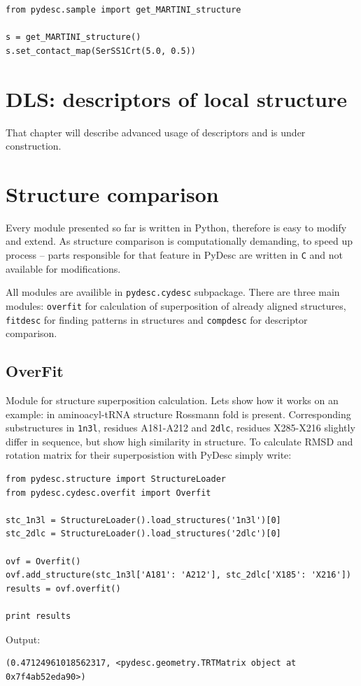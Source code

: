 \documentclass{article}
\begin{document}
\begin{lstlisting}
from pydesc.sample import get_MARTINI_structure

s = get_MARTINI_structure()
s.set_contact_map(SerSS1Crt(5.0, 0.5))
\end{lstlisting}


\section{DLS: descriptors of local structure} \label{PyDLSsec}

That chapter will describe advanced usage of descriptors and is under construction.



\section{Structure comparison} \label{CyDESCsec}

Every module presented so far is written in Python, therefore is easy to modify and extend. As structure comparison is computationally demanding, to speed up process -- parts responsible for that feature in PyDesc are written in \texttt{C} and not available for modifications.

All modules are availible in \texttt{pydesc.cydesc} subpackage. There are three main modules: \texttt{overfit} for calculation of superposition of already aligned structures, \texttt{fitdesc} for finding patterns in structures and \texttt{compdesc} for descriptor comparison.

%
%
\subsection{OverFit}

Module for structure superposition calculation.
Lets show how it works on an example: in aminoacyl-tRNA structure Rossmann fold is present.
Corresponding substructures in \texttt{1n3l}, residues A181-A212 and \texttt{2dlc}, residues X285-X216 slightly differ in sequence, but show high similarity in structure. To calculate RMSD and rotation matrix for their superposistion with PyDesc simply write:

\begin{lstlisting}
from pydesc.structure import StructureLoader
from pydesc.cydesc.overfit import Overfit

stc_1n3l = StructureLoader().load_structures('1n3l')[0]
stc_2dlc = StructureLoader().load_structures('2dlc')[0]

ovf = Overfit()
ovf.add_structure(stc_1n3l['A181': 'A212'], stc_2dlc['X185': 'X216'])
results = ovf.overfit()

print results
\end{lstlisting}
Output:
\begin{lstlisting}
(0.47124961018562317, <pydesc.geometry.TRTMatrix object at 0x7f4ab52eda90>)
\end{lstlisting}
\end{document}
